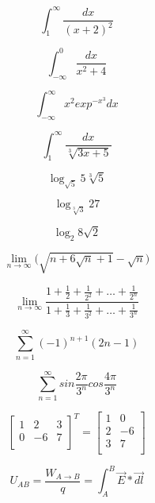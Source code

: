 \documentclass[12pt, letterpaper, titlepage]{article}
\begin{document}
\begin{center}
$$
\int_{1}^{\infty} \frac{dx}{(x+2)^2}
$$

$$
\int_{-\infty}^{0} \frac{dx}{x^2+4}
$$

$$
\int_{-\infty}^{\infty} x^{2} exp^{-x^{3}} dx
$$

$$
\int_{1}^{\infty} \frac{dx}{\sqrt[3]{3x+5}}
$$

$$
\log_{\sqrt{5}}5\sqrt[3]{5}
$$

$$
\log_{\sqrt[3]{3}}27
$$ 

$$
\log_{2}8\sqrt{2}
$$

$$
\lim_{n\to\infty} \bigg(\sqrt{n+6\sqrt{n}+1}-\sqrt{n}\bigg)
$$

$$
\lim_{n\to\infty} \frac{1+\frac{1}{2}+\frac{1}{2^2}+\ldots+\frac{1}{2^n}}{ 1+\frac{1}{3}+\frac{1}{3^2}+\ldots+\frac{1}{3^n}}
$$

$$
\sum_{n=1}^{\infty} (-1)^{n+1}(2n-1)
$$

$$
\sum_{n=1}^{\infty} sin\frac{2\pi}{3^n} cos\frac{4\pi}{3^n}
$$

$$
\mathbf{}
\left[ \begin{array}{ccc}
1 & 2 & 3 \\
0 & -6 & 7 \\
\end{array} 
\right]^T
=
\mathbf{}
\left[ \begin{array}{cc}
1 & 0\\
2 & -6\\
3 & 7\\
\end{array} 
\right]
$$

$$
U_{AB}=\frac{W_{A \rightarrow B}}{q}= \int_{A}^{B}\vec{E}*\vec{dl}
$$



\end{center}
\end{document}
